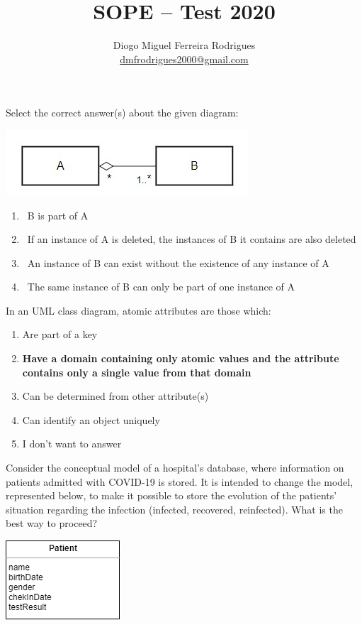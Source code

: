\documentclass{bdad}
\title{SOPE -- Test 2020}
\author{Diogo Miguel Ferreira Rodrigues \\ \href{mailto:dmfrodrigues2000@gmail.com}{dmfrodrigues2000@gmail.com}}
\begin{document}
\renewcommand{\theenumi}{\alph{enumi}}


Select the correct answer(s) about the given diagram:

\begin{center}
    \includegraphics[scale=0.8]{2020T-01.jpg}
\end{center}

\begin{enumerate}
    \item \boxedgreencheckmark~B is part of A 
    \item \boxedredcross      ~If an instance of A is deleted, the instances of B it contains are also deleted 
    \item \boxedgreencheckmark~An instance of B can exist without the existence of any instance of A 
    \item \boxedredcross      ~The same instance of B can only be part of one instance of A 
\end{enumerate}

In an UML class diagram, atomic attributes are those which:

\begin{enumerate}
    \item Are part of a key
    \item \textbf{Have a domain containing only atomic values and the attribute contains only a single value from that domain \greencheckmark}
    \item Can be determined from other attribute(s)
    \item Can identify an object uniquely
    \item I don't want to answer
\end{enumerate}

\newpage
{}
Consider the conceptual model of a hospital's database, where information on patients admitted with COVID-19 is stored. It is intended to change the model, represented below, to make it possible to store the evolution of the patients' situation regarding the infection (infected, recovered, reinfected). What is the best way to proceed?

\begin{center}
    \includegraphics[scale=0.8]{2020T-03.png}
\end{center}
\end{document}
